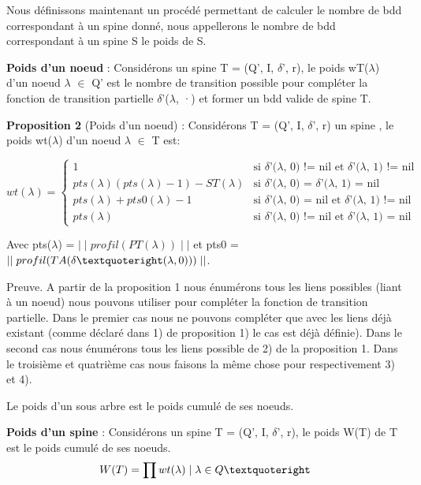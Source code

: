 \documentclass[french]{article}
\begin{document}
Nous définissons maintenant un procédé permettant de calculer le nombre de bdd correspondant à un spine donné, nous appellerons le nombre de bdd correspondant à un spine S le poids de S.

\textbf{Poids d'un noeud} : Considérons un spine T = (Q’, I, \(\delta\)’, r), le poids wT(\(\lambda\)) d'un noeud \(\lambda\) \(\in\) Q’ est le nombre de transition possible pour compléter la fonction de transition partielle \(\delta\)’(\(\lambda\), ·) et former un bdd valide de spine T.

\textbf{Proposition 2} (Poids d'un noeud) : Considérons T = (Q’, I, \(\delta\)’, r) un spine , le poids wt(\(\lambda\)) d'un noeud \(\lambda\) \(\in\) T est:

\begin{equation}
    wt(\lambda) =
    \begin{cases}
        1 & \text{si \(\delta\)’(\(\lambda\), 0) != nil et \(\delta\)’(\(\lambda\), 1) != nil}\\
        pts(\lambda) (pts(\lambda) - 1) - ST(\lambda) & \text{si \(\delta\)’(\(\lambda\), 0) = \(\delta\)’(\(\lambda\), 1) = nil}\\
        pts(\lambda) + pts0(\lambda) - 1  & \text{si \(\delta\)’(\(\lambda\), 0) = nil et \(\delta\)’(\(\lambda\), 1) != nil}\\
        pts(\lambda)   & \text{si \(\delta\)’(\(\lambda\), 0) != nil et \(\delta\)’(\(\lambda\), 1) = nil}
    \end{cases}       
\end{equation}

Avec pts(\(\lambda\)) = \(\mid\mid profil(PT(\lambda)) \mid\mid\) et pts0 = \(\mid\mid profil(TA(\delta \textquoteright(\lambda,0))) \mid\mid\).

Preuve. A partir de la proposition 1 nous énumérons tous les liens possibles (liant à un noeud) nous pouvons utiliser pour compléter la fonction de transition partielle. Dans le premier cas nous ne pouvons compléter que avec les liens déjà existant (comme déclaré dans 1) de proposition 1) le cas est déjà définie). Dans le second cas nous énumérons tous les liens possible de 2) de la proposition 1. Dans le troisième et quatrième cas nous faisons la même chose pour respectivement  3) et 4).
\vspace{5mm} %

Le poids d'un sous arbre est le poids cumulé de ses noeuds.

\textbf{Poids d'un spine} : Considérons un spine T = (Q’, I, \(\delta\)’, r), le poids W(T) de T est le poids cumulé de ses noeuds.
\[W(T) = \prod wt(\lambda) \mid \lambda \in Q\textquoteright\]
\end{document}
